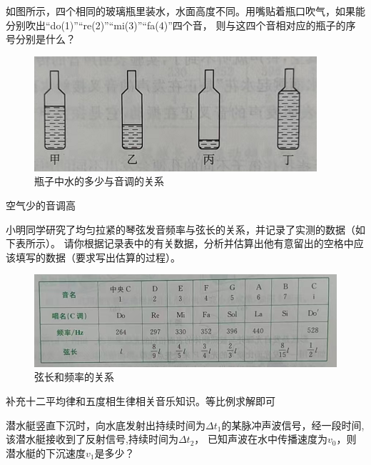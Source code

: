 \documentclass[windows,csize4, answers]{BHCexam}
\begin{document}
\begin{groups}
\begin{questions}[]
        \question[5] 如图所示，四个相同的玻璃瓶里装水，水面高度不同。用嘴贴着瓶口吹气，如果能分别吹出“do(1)”“re(2)”“mi(3)”“fa(4)”四个音，
        则与这四个音相对应的瓶子的序号分别是什么？
        \begin{figure}[htb]
            \centering
            \includegraphics [scale=0.75,trim=0 0 0 0]{./image/fig_2_9.PNG}
            \caption{瓶子中水的多少与音调的关系}
            \label{fig:fig_2_9}
        \end{figure}
        \begin{solution}{0.5cm}
            \methodonly 空气少的音调高
        \end{solution}

        \question[5] 小明同学研究了均匀拉紧的琴弦发音频率与弦长的关系，并记录了实测的数据（如下表所示）。
        请你根据记录表中的有关数据，分析并估算出他有意留出的空格中应该填写的数据（要求写出估算的过程）。
        \begin{figure}[htb]
            \centering
            \includegraphics [scale=0.75,trim=0 0 0 0]{./image/fig_2_10.PNG}
            \caption{弦长和频率的关系}
            \label{fig:fig_2_10}
        \end{figure}
        \begin{solution}{0.5cm}
            \methodonly 补充十二平均律和五度相生律相关音乐知识。等比例求解即可
        \end{solution}



    \end{questions}

    \begin{questions}[]
        \question[5] 潜水艇竖直下沉时，向水底发射出持续时间为$\Delta t_1$的某脉冲声波信号，经一段时间,该潜水艇接收到了反射信号,持续时间为$\Delta t_2$，
        已知声波在水中传播速度为$v_0$，则潜水艇的下沉速度$v_1$是多少？


\end{questions}
\end{groups}
\end{document}
